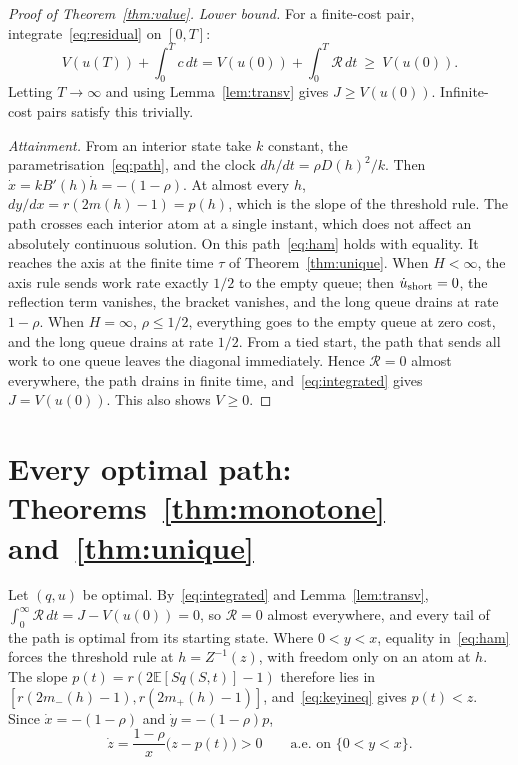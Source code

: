 \documentclass[11pt]{article}
\numberwithin{equation}{section}
\theoremstyle{definition}
\theoremstyle{remark}
\newcommand{\E}{\mathbb{E}}
\begin{document}
\begin{proof}[Proof of Theorem~\ref{thm:value}]
\emph{Lower bound.} For a finite-cost pair, integrate~\eqref{eq:residual} on $[0,T]$:
\begin{equation}\label{eq:integrated}
V(u(T))+\int_0^Tc\,dt=V(u(0))+\int_0^T\mathcal R\,dt\ \ge\ V(u(0)).
\end{equation}
Letting $T\to\infty$ and using Lemma~\ref{lem:transv} gives $J\ge V(u(0))$. Infinite-cost pairs satisfy this trivially.

\emph{Attainment.} From an interior state take $k$ constant, the parametrisation~\eqref{eq:path}, and the clock $dh/dt=\rho D(h)^2/k$. Then $\dot x=kB'(h)\dot h=-(1-\rho)$. At almost every $h$, $dy/dx=r(2m(h)-1)=p(h)$, which is the slope of the threshold rule. The path crosses each interior atom at a single instant, which does not affect an absolutely continuous solution. On this path~\eqref{eq:ham} holds with equality. It reaches the axis at the finite time $\tau$ of Theorem~\ref{thm:unique}. When $H<\infty$, the axis rule sends work rate exactly $1/2$ to the empty queue; then $\dot u_{\rm short}=0$, the reflection term vanishes, the bracket vanishes, and the long queue drains at rate $1-\rho$. When $H=\infty$, $\rho\le1/2$, everything goes to the empty queue at zero cost, and the long queue drains at rate $1/2$. From a tied start, the path that sends all work to one queue leaves the diagonal immediately. Hence $\mathcal R=0$ almost everywhere, the path drains in finite time, and~\eqref{eq:integrated} gives $J=V(u(0))$. This also shows $V\ge0$.
\end{proof}

\section{Every optimal path: Theorems~\ref{thm:monotone} and~\ref{thm:unique}}\label{sec:allopt}

Let $(q,u)$ be optimal. By~\eqref{eq:integrated} and Lemma~\ref{lem:transv}, $\int_0^\infty\mathcal R\,dt=J-V(u(0))=0$, so $\mathcal R=0$ almost everywhere, and every tail of the path is optimal from its starting state. Where $0<y<x$, equality in~\eqref{eq:ham} forces the threshold rule at $h=Z^{-1}(z)$, with freedom only on an atom at $h$. The slope $p(t)=r(2\E[Sq(S,t)]-1)$ therefore lies in $[r(2m_-(h)-1),r(2m_+(h)-1)]$, and~\eqref{eq:keyineq} gives $p(t)<z$. Since $\dot x=-(1-\rho)$ and $\dot y=-(1-\rho)p$,
\begin{equation}\label{eq:zdot}
\dot z=\frac{1-\rho}{x}\bigl(z-p(t)\bigr)>0\qquad\text{a.e. on }\{0<y<x\}.
\end{equation}
\end{document}
